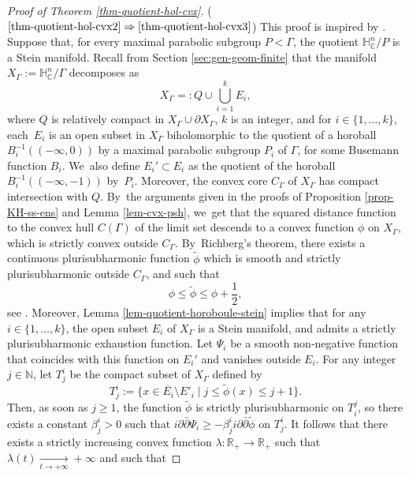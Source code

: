 \documentclass[11pt]{article}
\theoremstyle{definition}
\newcommand{\C}{\mathbb{C}}
\newcommand{\R}{\mathbb{R}}
\newcommand{\N}{\mathbb{N}}
\newcommand{\HNC}{\mathbb{H}^{n}_{\C}}
\def\C{\mathbb{C}}
\newcommand{\HNC}{\mathbb{H}^{n}_{\C}}
\begin{document}
\begin{proof}[Proof of Theorem \ref{thm-quotient-hol-cvx}]
($\eqref{thm-quotient-hol-cvx2}\Rightarrow\eqref{thm-quotient-hol-cvx3}$) This proof is inspired by \cite[Proof of Th.\,1.4]{chenDiscreteGroupsHolomorphic2013}. Suppose that, for every maximal parabolic subgroup $P<\Gamma$, the quotient $\HNC/P$ is a Stein manifold. Recall from Section \ref{sec:gen-geom-finite} that the manifold $X_{\Gamma}:=\HNC/\Gamma$ decomposes as
\begin{equation*}
X_{\Gamma} =: Q \cup \bigcup_{i=1}^{k}E_i,
\end{equation*}
where $Q$ is relatively compact in $X_{\Gamma} \cup \partial X_{\Gamma}$, $k$ is an integer, and for $i\in \{1,\dots,k\}$, each~$E_i$ is an open subset in $X_{\Gamma}$ biholomorphic to the quotient of a horoball $B_i^{-1}((-\infty,0))$ by a maximal parabolic subgroup $P_i$ of $\Gamma$, for some Busemann function $B_i$. We~also define $E_i'\subset E_i$ as the quotient of the horoball $B_i^{-1}((-\infty,-1))$ by~$P_i$. Moreover, the convex core $C_{\Gamma}$ of $X_{\Gamma}$ has compact intersection with $Q$. By~the arguments given in the proofs of Proposition \ref{prop-KH-ss-ens} and Lemma \ref{lem-cvx-psh}, we~get that the squared distance function to the convex hull $C(\Gamma)$ of the limit set descends to a convex function $\phi$ on $X_{\Gamma}$, which is strictly convex outside $C_{\Gamma}$. By~Richberg's theorem, there exists a continuous plurisubharmonic function $\widetilde{\phi}$ which is smooth and strictly plurisubharmonic outside $C_{\Gamma}$, and such that
\begin{equation*}
\phi \le \widetilde{\phi} \le \phi + \frac{1}{2},
\end{equation*}see \cite[Th.\,I.5.21]{demaillyComplexAnalyticDifferential-manuel}. Moreover, Lemma \ref{lem-quotient-horoboule-stein} implies that for any $i\in \{1,\dots,k\}$, the open subset $E_i$ of $X_{\Gamma}$ is a Stein manifold, and admits a strictly plurisubharmonic exhaustion function. Let $\Psi_i$ be a smooth non-negative function that coincides with this function on $E_i'$ and vanishes outside $E_i$. For any integer $j\in \N$, let $T^{i}_j$ be the compact subset of $X_{\Gamma}$ defined by
\begin{equation*}
T^{i}_j:= \{x\in \overline{E_i}\setminus E'_i \mid j\le \widetilde{\phi}(x) \le j+1\}.
\end{equation*}
Then, as soon as $j\ge1$, the function $\widetilde{\phi}$ is strictly plurisubharmonic on $T_i^{j}$, so there exists a constant $\beta^{i}_j>0$ such that $i\partial\bar{\partial} \Psi_i \ge -\beta^{i}_j i\partial\bar{\partial} \widetilde{\phi}$ on $T^{i}_j$. It follows that there exists a strictly increasing convex function $\lambda:\R_{+}\to\R_{+}$ such that $\lambda(t)\underset{t\to+\infty}{\longrightarrow}+\infty$ and such that

\end{proof}
\end{document}
